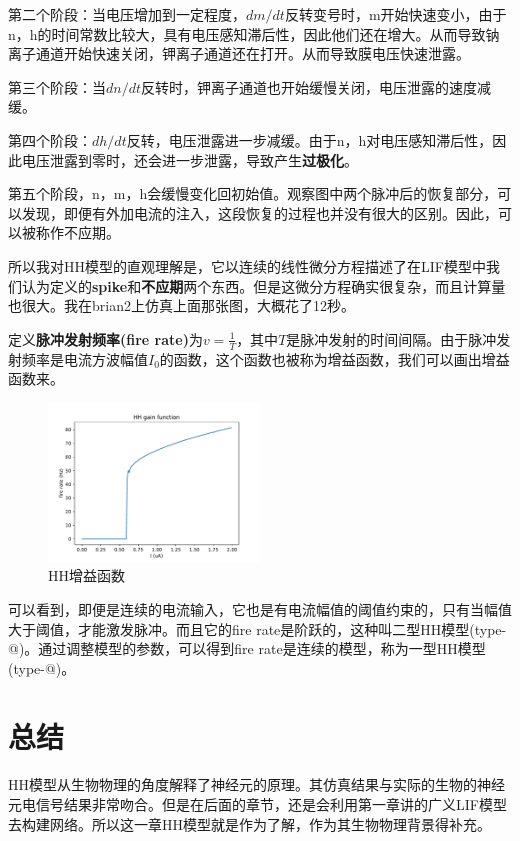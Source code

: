 \documentclass[12pt, a4paper, oneside]{ctexbook}
\makeatletter
\newcommand{\Rmnum}[1]{\expandafter\@slowromancap\romannumeral #1@}
\makeatother
\begin{document}
第二个阶段：当电压增加到一定程度，$dm/dt$反转变号时，m开始快速变小，由于n，h的时间常数比较大，具有电压感知滞后性，因此他们还在增大。从而导致钠离子通道开始快速关闭，钾离子通道还在打开。从而导致膜电压快速泄露。

第三个阶段：当$dn/dt$反转时，钾离子通道也开始缓慢关闭，电压泄露的速度减缓。

第四个阶段：$dh/dt$反转，电压泄露进一步减缓。由于n，h对电压感知滞后性，因此电压泄露到零时，还会进一步泄露，导致产生\textbf{过极化}。

第五个阶段，n，m，h会缓慢变化回初始值。观察图中两个脉冲后的恢复部分，可以发现，即便有外加电流的注入，这段恢复的过程也并没有很大的区别。因此，可以被称作不应期。

所以我对HH模型的直观理解是，它以连续的线性微分方程描述了在LIF模型中我们认为定义的\textbf{spike}和\textbf{不应期}两个东西。但是这微分方程确实很复杂，而且计算量也很大。我在brian2上仿真上面那张图，大概花了12秒。

定义\textbf{脉冲发射频率(fire rate)}为$v=\frac{1}{T}$，其中$T$是脉冲发射的时间间隔。由于脉冲发射频率是电流方波幅值$I_0$的函数，这个函数也被称为增益函数，我们可以画出增益函数来。

\begin{figure}[H]
    \centering
    \includegraphics[width=0.5\textwidth]{HH增益函数.pdf}
    \caption{HH增益函数}
\end{figure}

可以看到，即便是连续的电流输入，它也是有电流幅值的阈值约束的，只有当幅值大于阈值，才能激发脉冲。而且它的fire rate是阶跃的，这种叫二型HH模型(type-\Rmnum{2})。通过调整模型的参数，可以得到fire rate是连续的模型，称为一型HH模型(type-\Rmnum{1})。

\section{总结}

HH模型从生物物理的角度解释了神经元的原理。其仿真结果与实际的生物的神经元电信号结果非常吻合。但是在后面的章节，还是会利用第一章讲的广义LIF模型去构建网络。所以这一章HH模型就是作为了解，作为其生物物理背景得补充。
\end{document}
